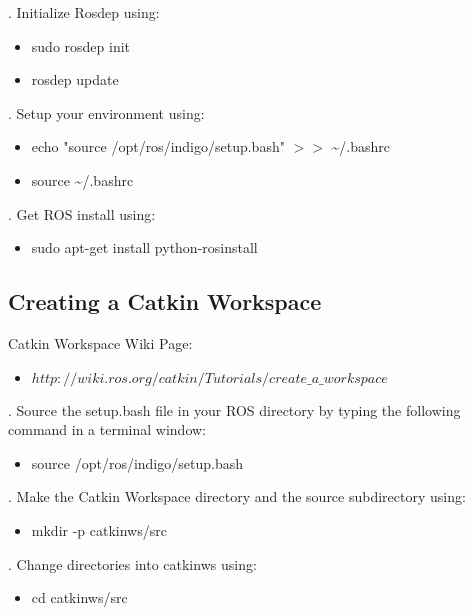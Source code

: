 . Initialize Rosdep using:
\begin{itemize}
	\item[]sudo rosdep init
	\item[]rosdep update
\end{itemize}

. Setup your environment using:
\begin{itemize}
	\item[]echo "source /opt/ros/indigo/setup.bash" $>>$ \textasciitilde /.bashrc
	\item[]source \textasciitilde /.bashrc
\end{itemize}

. Get ROS install using:
\begin{itemize}
	\item[]sudo apt-get install python-rosinstall
\end{itemize}


\subsection{Creating a Catkin Workspace}

\noindent Catkin Workspace Wiki Page:
\begin{itemize}
	\item[]\href{http://wiki.ros.org/catkin/Tutorials/create_a_workspace}{$http://wiki.ros.org/catkin/Tutorials/create\_a\_workspace$}
\end{itemize}

. Source the setup.bash file in your ROS directory by typing the following command in a terminal window:
\begin{itemize}
	\item[]source /opt/ros/indigo/setup.bash
\end{itemize}

. Make the Catkin Workspace directory and the source subdirectory using:
\begin{itemize}
	\item[]mkdir -p catkin\textunderscore ws/src
\end{itemize}

. Change directories into catkin\textunderscore  ws using:
\begin{itemize}
	\item[]cd catkin\textunderscore ws/src
\end{itemize}

